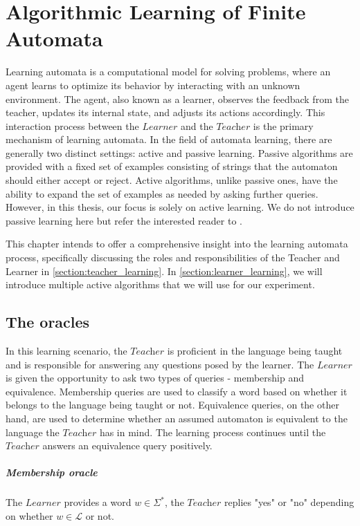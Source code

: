 \chapter{Algorithmic Learning of Finite Automata}\label{chapter:learning_algorithm}
Learning automata is a computational model for solving problems, where an agent learns 
to optimize its behavior by interacting with an unknown environment. 
The agent, also known as a learner, 
observes the feedback from the teacher, updates its internal state, and adjusts its 
actions accordingly. 
This interaction process between the $\textit{Learner}$ and the $\textit{Teacher}$ 
is the primary mechanism of learning automata.
In the field of automata learning, there are generally two distinct settings: 
active and passive learning. Passive algorithms are provided with a fixed set of 
examples consisting of strings that the automaton should either accept or reject. 
Active algorithms, unlike passive ones, have the ability to expand the set of examples as needed
by asking further queries.
However, in this thesis, our focus is solely on active learning.
We do not introduce passive learning here but refer the interested reader to \cite*{clarke2009model}.

This chapter intends to offer a comprehensive insight into the 
learning automata process, specifically discussing the roles and 
responsibilities of the Teacher and Learner in \autoref{section:teacher_learning}. 
In \autoref{section:learner_learning}, 
we will introduce multiple active algorithms that we will use for our experiment.
\section{The oracles}\label{section:teacher_learning}
In this learning scenario, the $\textit{Teacher}$ is proficient in the language being taught 
and is responsible for answering any questions posed by the learner. The $\textit{Learner}$ 
is given the opportunity to ask two types of queries - membership and equivalence. 
Membership queries are used to classify a word based on whether it belongs to the 
language being taught or not. Equivalence queries, on the other hand, are used to 
determine whether an assumed automaton is equivalent to the language the $\textit{Teacher}$ has 
in mind. The learning process continues until the $\textit{Teacher}$ answers an equivalence query 
positively.
\paragraph*{Membership oracle} 
The $\textit{Learner}$ provides a word $w \in \Sigma^{*}$, the $\textit{Teacher}$ replies "yes" 
or "no" depending on whether $w \in \mathcal{L}$ or not.
